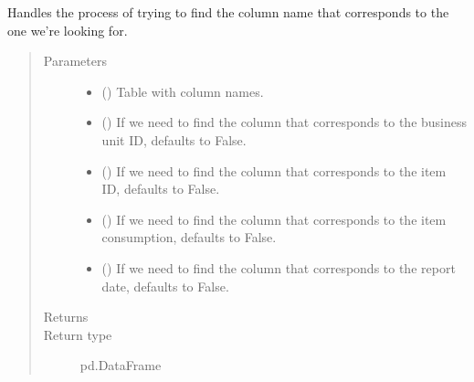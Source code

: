 \documentclass[letterpaper,10pt,english]{sphinxmanual}
\begin{document}
\begin{fulllineitems}
\label{\detokenize{source/optimization.datatools:optimization.datatools.dataprep.handle_name_matching_errors}}
Handles the process of trying to find the column name that corresponds
to the one we’re looking for.
\begin{quote}\begin{description}
\item[{Parameters}] \leavevmode\begin{itemize}
\item {} 
 () \textendash{} Table with column names.

\item {} 
 (\sphinxstyleliteralemphasis{\sphinxupquote{, }}) \textendash{} If we need to find the column that corresponds to the business unit ID, defaults to False.

\item {} 
 (\sphinxstyleliteralemphasis{\sphinxupquote{, }}) \textendash{} If we need to find the column that corresponds to the item ID, defaults to False.

\item {} 
 (\sphinxstyleliteralemphasis{\sphinxupquote{, }}) \textendash{} If we need to find the column that corresponds to the item consumption, defaults to False.

\item {} 
 (\sphinxstyleliteralemphasis{\sphinxupquote{, }}) \textendash{} If we need to find the column that corresponds to the report date, defaults to False.

\end{itemize}

\item[{Returns}] \leavevmode
{}

\item[{Return type}] \leavevmode
pd.DataFrame

\end{description}\end{quote}

\end{fulllineitems}
\end{document}
